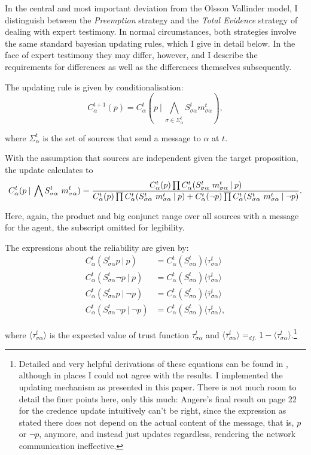 \documentclass[11pt, a4paper]{scrartcl}
\newcommand{\Stsa}{S^t_{\sigma\alpha}}
\newcommand{\sa}{{\sigma\alpha}}
\newcommand{\given}[1][]{\:#1\vert\:}
\newcommand{\Sm}{\Stsa~m^t_{\sa}}
\renewcommand{\i}[1]{\emph{#1}}
\renewcommand{\a}{\alpha}
\begin{document}
In the central and most important deviation from the Olsson Vallinder model, I distinguish between the \i{Preemption} strategy and the \i{Total Evidence} strategy of dealing with expert testimony. In normal circumstances, both strategies involve the same standard bayesian updating rules, which I give in detail below. In the face of expert testimony they may differ, however, and I describe the requirements for differences as well as the differences themselves subsequently. 

The updating rule is given by conditionalisation:
\[
    C^{t+1}_\alpha (p) = C^t_\alpha (p \given \bigwedge_{\sigma \in \Sigma^t_\alpha} \Stsa m^t_{\sa}),
\]

where $\Sigma^t_\alpha$ is the set of sources that send a message to $\alpha$ at $t$.

With the assumption that sources are independent given the target proposition, the update calculates to
\begin{equation}
    \label{eq:upd}
    C^t_\a (p \given \bigwedge \Sm) = \\
     \frac{C^t_\a (p) \prod C^t_\a (\Sm \given p) }
    {C^t_\a (p) \prod C^t_\a (\Sm \given p) +  C^t_\a (\neg p) \prod C^t_\a (\Sm \given \neg p) }.
\end{equation}

Here, again, the product and big conjunct range over all sources with a message for the agent, the subscript omitted for legibility.   

The expressions about the reliability are given by:
\begin{align*}
    C^t_\a (\Stsa p \given p) &= C^t_\a (\Stsa) \langle \tau^t_{\sa} \rangle \\
    C^t_\a (\Stsa \neg p \given p) &= C^t_\a (\Stsa) \langle \bar{\tau}^t_{\sa} \rangle \\
    C^t_\a (\Stsa p \given \neg p) &= C^t_\a (\Stsa) \langle \bar{\tau}^t_{\sa} \rangle \\
    C^t_\a (\Stsa \neg p \given \neg p) &= C^t_\a (\Stsa) \langle \tau^t_{\sa} \rangle,
\end{align*}

where $\langle \tau^t_{\sa} \rangle $ is the expected value of trust function $ \tau^t_{\sa} $ and ${\langle \bar{\tau}^t_{\sa} \rangle =_{df.} 1 - \langle \tau^t_{\sa} \rangle}$.\footnote{Detailed and very helpful derivations of these equations can be found in \textcite{Angere2010}, although in places I could not agree with the results. I implemented the updating mechanism as presented in this paper. There is not much room to detail the finer points here, only this much: Angere's final result on page 22 for the credence update intuitively can't be right, since the expression as stated there does not depend on the actual content of the message, that is, $p$ or $\neg p$, anymore, and instead just updates regardless, rendering the network communication ineffective.} 
\end{document}
